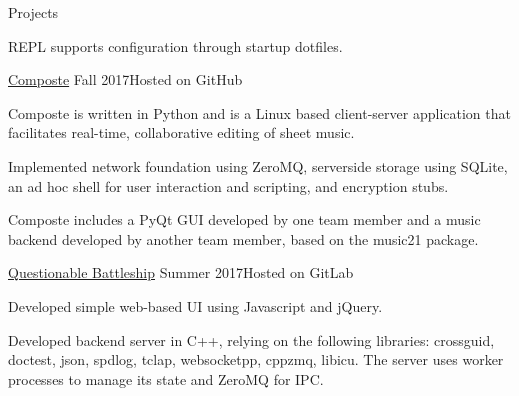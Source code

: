 \documentclass{resume} %
\begin{document}
\begin{rSection}{Projects}
\begin{rSubsection}
\item REPL supports configuration through startup dotfiles.

\end{rSubsection}

\begin{rSubsection}
    {\href{https://composte.me}{Composte}}
    {Fall 2017}{Hosted on GitHub}

\item Composte is written in Python and is a Linux based client-server
    application that facilitates real-time, collaborative editing of sheet
    music.

\item Implemented network foundation using ZeroMQ, serverside storage using
    SQLite, an ad hoc shell for user interaction and scripting, and encryption
    stubs.

\item Composte includes a PyQt GUI developed by one team member and a music
    backend developed by another team member, based on the music21 package.

\end{rSubsection}

\begin{rSubsection}
    {\href{https://www.questionablebattleship.com/simple}{Questionable Battleship}}
    {Summer 2017}{Hosted on GitLab}


\item Developed simple web-based UI using Javascript and jQuery.

\item Developed backend server in C++, relying on the following libraries:
    crossguid, doctest, json, spdlog, tclap, websocketpp, cppzmq,
    libicu. The server uses worker processes to manage its state and ZeroMQ
    for IPC.

\end{rSubsection}




\end{rSection}
\end{document}
